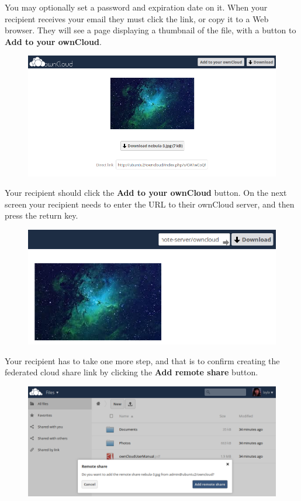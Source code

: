 \documentclass[letterpaper,10pt,english]{sphinxmanual}
\begin{document}
You may optionally set a password and expiration date on it. When your recipient
receives your email they must click the link, or copy it to a Web
browser. They will see a page displaying a thumbnail of the file, with a button
to \textbf{Add to your ownCloud}.
\begin{figure}[htbp]
\centering

\includegraphics{create_public_share-8.png}
\end{figure}

Your recipient should click the \textbf{Add to your ownCloud} button. On the next
screen your recipient needs to enter the URL to their ownCloud
server, and then press the return key.
\begin{figure}[htbp]
\centering

\includegraphics{create_public_share-9.png}
\end{figure}

Your recipient has to take one more step, and that is to confirm creating the
federated cloud share link by clicking the \textbf{Add remote share} button.
\begin{figure}[htbp]
\centering

\includegraphics{create_public_share-10.png}
\end{figure}
\end{document}
